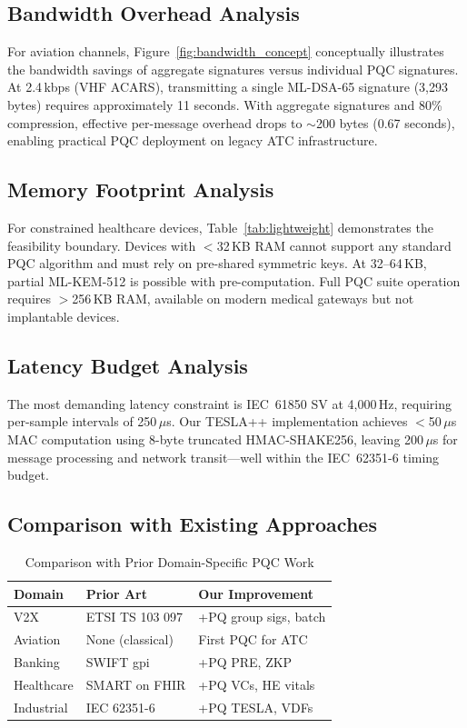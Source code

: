 \documentclass[conference,10pt]{IEEEtran}
\newcommand{\mldsa}{\textsf{ML-DSA}}
\newcommand{\shake}{\textsf{SHAKE256}}
\begin{document}
\subsection{Bandwidth Overhead Analysis}

For aviation channels, Figure~\ref{fig:bandwidth_concept} conceptually illustrates the bandwidth savings of aggregate signatures versus individual PQC signatures. At 2.4\,kbps (VHF ACARS), transmitting a single \mldsa{}-65 signature (3{,}293 bytes) requires approximately 11 seconds. With aggregate signatures and 80\% compression, effective per-message overhead drops to $\sim$200 bytes (0.67 seconds), enabling practical PQC deployment on legacy ATC infrastructure.

\subsection{Memory Footprint Analysis}

For constrained healthcare devices, Table~\ref{tab:lightweight} demonstrates the feasibility boundary. Devices with $<$32\,KB RAM cannot support any standard PQC algorithm and must rely on pre-shared symmetric keys. At 32--64\,KB, partial ML-KEM-512 is possible with pre-computation. Full PQC suite operation requires $>$256\,KB RAM, available on modern medical gateways but not implantable devices.

\subsection{Latency Budget Analysis}

The most demanding latency constraint is IEC~61850 SV at 4{,}000\,Hz, requiring per-sample intervals of 250\,$\mu$s. Our TESLA++ implementation achieves $<$50\,$\mu$s MAC computation using 8-byte truncated HMAC-\shake{}, leaving 200\,$\mu$s for message processing and network transit---well within the IEC~62351-6 timing budget.

\subsection{Comparison with Existing Approaches}

\begin{table}[t]
\centering
\caption{Comparison with Prior Domain-Specific PQC Work}
\label{tab:comparison}
\begin{tabular}{lll}
\toprule
\textbf{Domain} & \textbf{Prior Art} & \textbf{Our Improvement} \\
\midrule
V2X & ETSI TS 103 097 & +PQ group sigs, batch \\
Aviation & None (classical) & First PQC for ATC \\
Banking & SWIFT gpi & +PQ PRE, ZKP \\
Healthcare & SMART on FHIR & +PQ VCs, HE vitals \\
Industrial & IEC 62351-6 & +PQ TESLA, VDFs \\
\bottomrule
\end{tabular}
\end{table}
\end{document}
